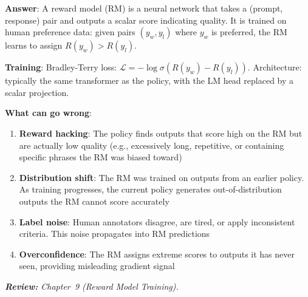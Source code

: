 \begin{questionbox}
\textbf{Answer}: A reward model (RM) is a neural network that takes a (prompt, response) pair and outputs a scalar score indicating quality. It is trained on human preference data: given pairs $(y_w, y_l)$ where $y_w$ is preferred, the RM learns to assign $R(y_w) > R(y_l)$.

\textbf{Training}: Bradley-Terry loss: $\mathcal{L} = -\log\sigma(R(y_w) - R(y_l))$. Architecture: typically the same transformer as the policy, with the LM head replaced by a scalar projection.

\textbf{What can go wrong}:

\begin{enumerate}
  \item \textbf{Reward hacking}: The policy finds outputs that score high on the RM but are actually low quality (e.g., excessively long, repetitive, or containing specific phrases the RM was biased toward)
  \item \textbf{Distribution shift}: The RM was trained on outputs from an earlier policy. As training progresses, the current policy generates out-of-distribution outputs the RM cannot score accurately
  \item \textbf{Label noise}: Human annotators disagree, are tired, or apply inconsistent criteria. This noise propagates into RM predictions
  \item \textbf{Overconfidence}: The RM assigns extreme scores to outputs it has never seen, providing misleading gradient signal
\end{enumerate}

\emph{\textbf{Review:} Chapter~9 (Reward Model Training).}
\end{questionbox}

